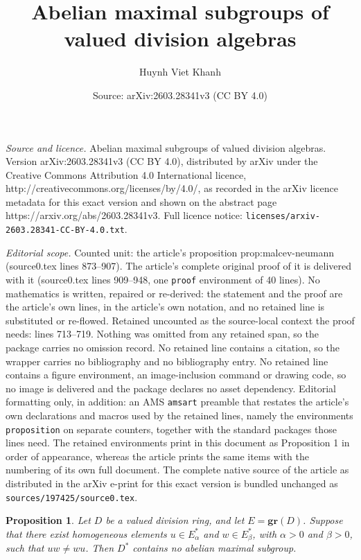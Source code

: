 \documentclass[10pt,a4paper]{amsart}
\title{Abelian maximal subgroups of valued division algebras}
\author{Huynh Viet Khanh}
\date{Source: arXiv:2603.28341v3 (CC BY 4.0)}
\newtheorem{proposition}{Proposition}
\begin{document}
\maketitle

\noindent\emph{Source and licence.} Abelian maximal subgroups of valued division algebras. Version arXiv:2603.28341v3 (CC BY 4.0), distributed by arXiv under the Creative Commons Attribution 4.0 International licence, http://creativecommons.org/licenses/by/4.0/, as recorded in the arXiv licence metadata for this exact version and shown on the abstract page https://arxiv.org/abs/2603.28341v3. Full licence notice: \texttt{licenses/arxiv-2603.28341-CC-BY-4.0.txt}.\par\smallskip

\noindent\textit{Editorial scope.} Counted unit: the article's proposition prop:malcev-neumann (source0.tex lines 873--907). The article's complete original proof of it is delivered with it (source0.tex lines 909--948, one \texttt{proof} environment of 40 lines). No mathematics is written, repaired or re-derived: the statement and the proof are the article's own lines, in the article's own notation, and no retained line is substituted or re-flowed.  Retained uncounted as the source-local context the proof needs: lines 713--719.  Nothing was omitted from any retained span, so the package carries no omission record.  No retained line contains a citation, so the wrapper carries no bibliography and no bibliography entry.  No retained line contains a figure environment, an image-inclusion command or drawing code, so no image is delivered and the package declares no asset dependency.  Editorial formatting only, in addition: an AMS \texttt{amsart} preamble that restates the article's own declarations and macros used by the retained lines, namely the environments \texttt{proposition} on separate counters, together with the standard packages those lines need.  The retained environments print in this document as Proposition 1 in order of appearance, whereas the article prints the same items with the numbering of its own full document.  The complete native source of the article as distributed in the arXiv e-print for this exact version is bundled unchanged as \texttt{sources/197425/source0.tex}.
\begin{proposition}
\label{prop:positive-positive-graded}
Let $D$ be a valued division ring, and let $E=\mathbf{gr}(D)$. Suppose that
there exist homogeneous elements $u\in E_\alpha^*$ and $w\in E_\beta^*$,
with $\alpha>0$ and $\beta>0$, such that $uw\ne wu$. Then $D^*$ contains no
abelian maximal subgroup.
\end{proposition}
\end{document}
